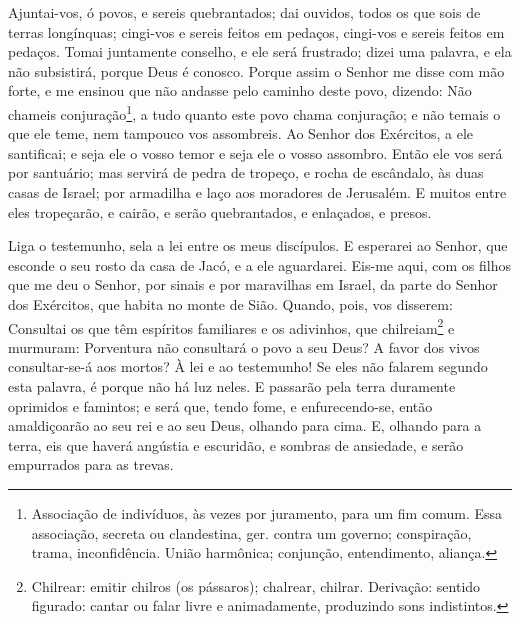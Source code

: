 Ajuntai-vos, ó povos, e sereis quebrantados; dai ouvidos, todos os
que sois de terras longínquas; cingi-vos e sereis feitos em pedaços,
cingi-vos e sereis feitos em pedaços. Tomai juntamente
conselho, e ele será frustrado; dizei uma palavra, e ela não
subsistirá, porque Deus é conosco. Porque assim o Senhor me
disse com mão forte, e me ensinou que não andasse pelo caminho deste
povo, dizendo: Não chameis conjuração\footnote{Associação de
indivíduos, às vezes por juramento, para um fim comum. Essa
associação, secreta ou clandestina, ger. contra um governo;
conspiração, trama, inconfidência. União harmônica; conjunção,
entendimento, aliança.}, a tudo quanto este povo chama conjuração; e
não temais o que ele teme, nem tampouco vos assombreis. Ao
Senhor dos Exércitos, a ele santificai; e seja ele o vosso temor e
seja ele o vosso assombro. Então ele vos será por santuário;
mas servirá de pedra de tropeço, e rocha de escândalo, às duas casas
de Israel; por armadilha e laço aos moradores de Jerusalém. E
muitos entre eles tropeçarão, e cairão, e serão quebrantados, e
enlaçados, e presos.

Liga o testemunho, sela a lei entre os meus discípulos. E
esperarei ao Senhor, que esconde o seu rosto da casa de Jacó, e a
ele aguardarei. Eis-me aqui, com os filhos que me deu o
Senhor, por sinais e por maravilhas em Israel, da parte do Senhor
dos Exércitos, que habita no monte de Sião. Quando, pois, vos
disserem: Consultai os que têm espíritos familiares e os adivinhos,
que chilreiam\footnote{Chilrear: emitir chilros (os pássaros);
chalrear, chilrar. Derivação: sentido figurado: cantar ou falar
livre e animadamente, produzindo sons indistintos.} e murmuram:
Porventura não consultará o povo a seu Deus? A favor dos vivos
consultar-se-á aos mortos? À lei e ao testemunho! Se eles não
falarem segundo esta palavra, é porque não há luz neles. E
passarão pela terra duramente oprimidos e famintos; e será que,
tendo fome, e enfurecendo-se, então amaldiçoarão ao seu rei e ao seu
Deus, olhando para cima. E, olhando para a terra, eis que
haverá angústia e escuridão, e sombras de ansiedade, e serão
empurrados para as trevas.

\medskip


